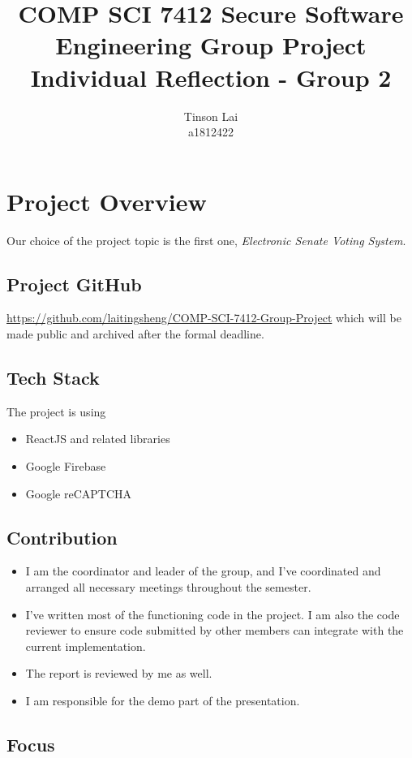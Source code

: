 \documentclass[12pt]{article}
\title{COMP SCI 7412 Secure Software Engineering Group Project Individual Reflection - Group 2}
\author{Tinson Lai \\ a1812422}
\date{}
\begin{document}
\maketitle

\section{Project Overview}

Our choice of the project topic is the first one, \textit{Electronic Senate Voting System}.

\subsection{Project GitHub}

\url{https://github.com/laitingsheng/COMP-SCI-7412-Group-Project} which will be made public and archived after the formal deadline.

\subsection{Tech Stack}

The project is using

\begin{itemize}
  \item ReactJS and related libraries
  \item Google Firebase
  \item Google reCAPTCHA
\end{itemize}

\subsection{Contribution}

\begin{itemize}
  \item I am the coordinator and leader of the group, and I've coordinated and arranged all necessary meetings throughout the semester.
  \item I've written most of the functioning code in the project. I am also the code reviewer to ensure code submitted by other members can integrate with the current implementation.
  \item The report is reviewed by me as well.
  \item I am responsible for the demo part of the presentation.
\end{itemize}

\subsection{Focus}
\end{document}
